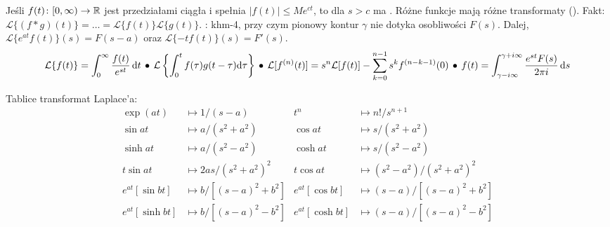 Jeśli  $f(t) \colon [0, \infty)\to \mathbb{R}$ jest przedziałami ciągła i spełnia $|f(t)| \le Me^{ct}$, to dla $s > c$ ma .
Różne funkcje mają różne transformaty ().
Fakt: $\mathcal L\{(f*g)(t)\} = \dots = \mathcal L\{f(t)\} \mathcal L\{g(t)\}$. 
: khm-4, przy czym pionowy kontur $\gamma$ nie dotyka osobliwości $F(s)$.
Dalej, $\mathcal L\{e^{at}f(t)\} (s) = F(s-a)$ oraz $\mathcal L\{-t f(t)\}(s) = F'(s)$.
\[
	\mathcal L\{f(t)\} = \int_0^\infty \frac{f(t)}{e^{st}} \,\textrm{d}t \, \bullet \,
	\mathcal L\left\{\int_0^t f(\tau) g(t-\tau) \textrm{d}\tau\right\} \, \bullet \,
	\mathcal L[f^{(n)}(t)] = s^n \mathcal L[f(t)] - \sum_{k=0}^{n-1} s^kf^{(n-k-1)}(0) \, \bullet \,
	f(t) = \int_{\gamma-i \infty}^{\gamma + i \infty} \frac{e^{st} F(s)}{2\pi i}\,\textrm{d}s
\]

Tablice transformat Laplace'a:
\begin{align*}
\exp(at) & \mapsto 1/(s-a) &
t^{n} & \mapsto {n!}/{s^{n+1}} \\
\sin at & \mapsto {a} / (s^2+a^2) &
\cos at & \mapsto {s} / (s^2+a^2) \\
\sinh at & \mapsto a/ (s^2-a^2) &
\cosh at & \mapsto s / (s^2-a^2) \\ 
t \sin at & \mapsto {2as}/(s^2+a^2)^2 &
t \cos at & \mapsto (s^2-a^2)/(s^2+a^2)^2 \\
e^{at} [\sin bt] & \mapsto {b}/{[(s-a)^2 + b^2]} &
e^{at} [\cos bt] & \mapsto {(s-a)}/{[(s-a)^2 + b^2]} \\
e^{at} [\sinh  bt] & \mapsto {b}/[(s-a)^2 - b^2] &
e^{at} [\cosh bt] & \mapsto {(s-a)}/[(s-a)^2 - b^2]
\end{align*}